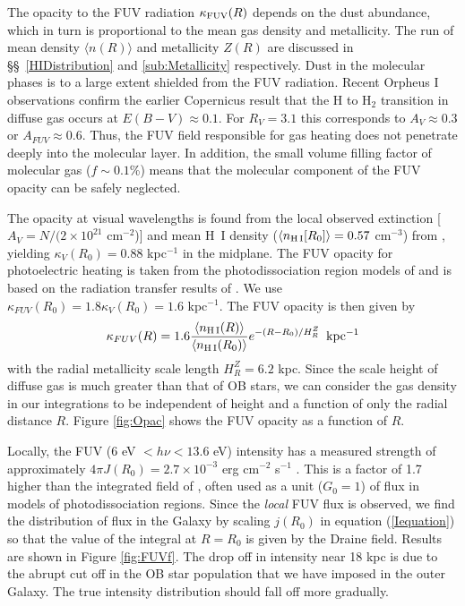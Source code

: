 \documentclass[12pt,preprint,flushrt]{aastex}
\begin{document}
The opacity to the FUV radiation $\kappa_{\rm FUV}(R)$ depends on the
dust abundance,
which in turn is proportional to the mean gas density and
metallicity.  The run of mean density $\langle n(R)\rangle$
and metallicity $Z(R)$ are discussed in \S\S\
\ref{HIDistribution} and \ref{sub:Metallicity} respectively.
Dust in the molecular phases is to a large extent
shielded from the FUV radiation. Recent Orpheus I
observations \citep{dix98} confirm
the earlier Copernicus result that the H to H$_2$ transition in diffuse
gas occurs at $E(B-V) \approx 0.1$. For $R_V = 3.1$ this corresponds to
$A_V\approx 0.3$ or $A_{FUV}\approx 0.6$. Thus, the FUV field
responsible for gas heating does not penetrate deeply into the molecular
layer. In addition, the small volume filling factor of molecular gas
($f\sim 0.1$\%) means that the molecular component of the FUV opacity
can be safely neglected.

The opacity at visual wavelengths is found from the
local observed extinction
[$A_V = N/(2\times 10^{21}$ cm$^{-2}$)] and mean
H~I density ($\langle n_{\rm H\,I}[R_0] \rangle=0.57$ cm$^{-3}$) from
\cite{dic90},  yielding
$\kappa_V(R_0 ) = 0.88$ kpc$^{-1}$ in the midplane. The FUV
opacity for photoelectric
heating is taken from the photodissociation region models
of \cite{tie85} and is based on the  radiation
transfer results of \cite{flann80}. We use
$\kappa_{FUV}(R_0) = 1.8 \kappa_V(R_0) = 1.6$ kpc$^{-1}$.
The FUV opacity is then given by
\begin{equation}
  \kappa_{FUV}(R) = 1.6 \frac{\langle n_{\rm H\,I}(R) \rangle}
          {\langle n_{\rm H\,I}(R_0) \rangle}
          {e}^{-(R-R_0)/H_R^Z} \, \, \, {\rm kpc^{-1}}
\end{equation}
with the radial metallicity scale length $H_R^Z=6.2$ kpc.
Since the scale height of
diffuse gas is much greater than that of OB stars, we can consider the
gas density in our integrations to be independent of height and a
function of only the radial distance $R$.
Figure \ref{fig:Opac} shows the FUV opacity as a function of $R$.

Locally, the FUV (6 eV $< h\nu < 13.6$ eV) intensity
has a measured strength of approximately
$4\pi J(R_0) = 2.7 \times 10^{-3}$ erg cm$^{-2}$ s$^{-1}$
\citep{dra78}. This is a factor of 1.7 higher than the
integrated field of \cite{hab68},
often used as a unit ($G_0=1$) of flux in models
of  photodissociation regions.  Since the {\em local} FUV flux is observed,
we find the distribution of flux in the Galaxy  by
scaling
$j(R_0)$ in
equation (\ref{Iequation}) so that the value of the
integral at  $R=R_0$ is given by the Draine field. Results
are shown in  Figure \ref{fig:FUVf}.
The drop off in intensity near 18 kpc is due to the abrupt cut off in the
OB star population that we have imposed in the outer Galaxy. The true
intensity
distribution should fall off more gradually.
\end{document}
